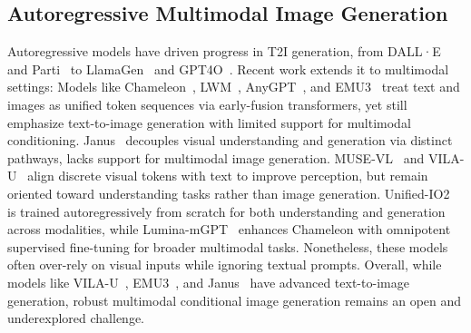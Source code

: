 \subsection{Autoregressive Multimodal Image Generation}
Autoregressive models have driven progress in T2I generation, from DALL·E~\cite{DALLE} and Parti~\citep{parti} to LlamaGen~\citep{llamagen} and GPT4O~\citep{gpt4o}.
Recent work extends it to multimodal settings: Models like Chameleon~\citep{chameleonteam2024chameleon}, LWM~\cite{LWM}, AnyGPT~\citep{Zhan2024AnyGPT}, and EMU3~\citep{Emu3} treat text and images as unified token sequences via early-fusion transformers, yet still emphasize text-to-image generation with limited support for multimodal conditioning.
Janus~\citep{Janus} decouples visual understanding and generation via distinct pathways, lacks support for multimodal image generation. MUSE-VL~\cite{musevl} and VILA-U~\citep{VILA-U}  align discrete visual tokens with text to improve perception, but remain oriented toward understanding tasks rather than image generation.
Unified-IO2~\citep{lu2023unifiedio2} is trained autoregressively from scratch for both understanding and generation across modalities, while Lumina-mGPT~\cite{2024lumina} enhances Chameleon with omnipotent supervised fine-tuning for broader multimodal tasks. Nonetheless, these models often over-rely on visual inputs while ignoring textual prompts.
Overall, while models like VILA-U~\cite{VILA-U}, EMU3~\cite{Emu3}, and Janus~\cite{Janus} have advanced text-to-image generation, robust multimodal conditional image generation remains an open and underexplored challenge.

